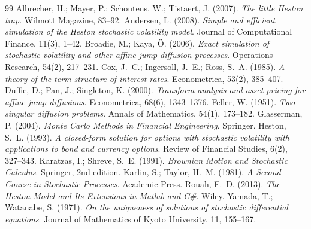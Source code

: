 \documentclass[11pt]{article}
\theoremstyle{plain}
\theoremstyle{definition}
\theoremstyle{remark}
\begin{document}
\begin{thebibliography}{99}
          Albrecher, H.; Mayer, P.; Schoutens, W.; Tistaert, J. (2007). \emph{The little Heston trap}. Wilmott Magazine, 83--92.
      Andersen, L. (2008). \emph{Simple and efficient simulation of the Heston stochastic volatility model}. Journal of Computational Finance, 11(3), 1--42.
     Broadie, M.; Kaya, Ö. (2006). \emph{Exact simulation of stochastic volatility and other affine jump-diffusion processes}. Operations Research, 54(2), 217--231.
           Cox, J.~C.; Ingersoll, J.~E.; Ross, S.~A. (1985). \emph{A theory of the term structure of interest rates}. Econometrica, 53(2), 385--407.
           Duffie, D.; Pan, J.; Singleton, K. (2000). \emph{Transform analysis and asset pricing for affine jump-diffusions}. Econometrica, 68(6), 1343--1376.
        Feller, W. (1951). \emph{Two singular diffusion problems}. Annals of Mathematics, 54(1), 173--182.
     Glasserman, P. (2004). \emph{Monte Carlo Methods in Financial Engineering}. Springer.
        Heston, S.~L. (1993). \emph{A closed-form solution for options with stochastic volatility with applications to bond and currency options}. Review of Financial Studies, 6(2), 327--343.
     Karatzas, I.; Shreve, S.~E. (1991). \emph{Brownian Motion and Stochastic Calculus}. Springer, 2nd edition.
     Karlin, S.; Taylor, H.~M. (1981). \emph{A Second Course in Stochastic Processes}. Academic Press.
         Rouah, F.~D. (2013). \emph{The Heston Model and Its Extensions in Matlab and C\#}. Wiley.
     Yamada, T.; Watanabe, S. (1971). \emph{On the uniqueness of solutions of stochastic differential equations}. Journal of Mathematics of Kyoto University, 11, 155--167.
\end{thebibliography}
\end{document}
